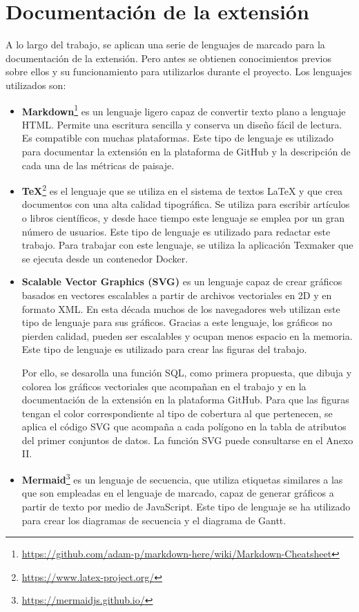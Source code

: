 \section{Documentación de la extensión}
A lo largo del trabajo, se aplican una serie de lenguajes de marcado para la documentación de la extensión. Pero antes se obtienen conocimientos previos sobre ellos y su funcionamiento para utilizarlos durante el proyecto. Los lenguajes utilizados son:
\begin{itemize}
\item\textbf{Markdown}\footnote{\url{https://github.com/adam-p/markdown-here/wiki/Markdown-Cheatsheet}} es un lenguaje ligero capaz de convertir texto plano a lenguaje HTML. Permite una escritura sencilla y conserva un diseño fácil de lectura. Es compatible con muchas plataformas. Este tipo de lenguaje es utilizado para documentar la extensión en la plataforma de GitHub y la descripción de cada una de las métricas de paisaje.
\item\textbf{TeX}\footnote{\url{https://www.latex-project.org/}} es el lenguaje que se utiliza en el sistema de textos LaTeX y que crea documentos con una alta calidad tipográfica. Se utiliza para escribir artículos o libros científicos, y desde hace tiempo este lenguaje se emplea por un gran número de usuarios. Este tipo de lenguaje es utilizado para redactar este trabajo. Para trabajar con este lenguaje, se utiliza la aplicación Texmaker que se ejecuta desde un contenedor Docker.
\item\textbf{Scalable Vector Graphics (SVG)} es un lenguaje capaz de crear gráficos basados en vectores escalables a partir de archivos vectoriales en 2D y en formato XML. En esta década muchos de los navegadores web utilizan este tipo de lenguaje para sus gráficos. Gracias a este lenguaje, los gráficos no pierden calidad, pueden ser escalables y ocupan menos espacio en la memoria. Este tipo de lenguaje es utilizado para crear las figuras del trabajo.

Por ello, se desarolla una función SQL, como primera propuesta, que dibuja y colorea los gráficos vectoriales que acompañan en el trabajo y en la documentación de la extensión en la plataforma GitHub. Para que las figuras tengan el color correspondiente al tipo de cobertura al que pertenecen, se aplica el código SVG que acompaña a cada polígono en la tabla de atributos del primer conjuntos de datos. La función SVG puede consultarse en el Anexo II.
\item\textbf{Mermaid}\footnote{\url{https://mermaidjs.github.io/}} es un lenguaje de secuencia, que utiliza etiquetas similares a las que son empleadas en el lenguaje de marcado, capaz de generar gráficos a partir de texto por medio de JavaScript. Este tipo de lenguaje se ha utilizado para crear los diagramas de secuencia y el diagrama de Gantt.
\end{itemize}


